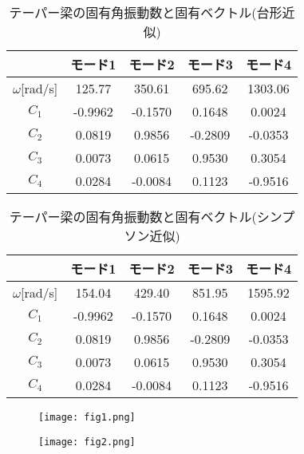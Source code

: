 \documentclass[12pt]{jsarticle}
\begin{document}
\begin{table}[htb]
  \begin{center}
    \caption{テーパー梁の固有角振動数と固有ベクトル(台形近似)}
    \begin{tabular}{|c|cccc|} \hline
       & モード1 & モード2 & モード3 & モード4  \\ \hline
      $\omega$[rad/s] & 125.77 & 350.61 & 695.62 & 1303.06 \\ \hline
      $C_1$ & -0.9962 & -0.1570 & 0.1648 & 0.0024 \\ \hline      
      $C_2$ & 0.0819 & 0.9856 & -0.2809 & -0.0353 \\ \hline
      $C_3$ & 0.0073 & 0.0615 & 0.9530 & 0.3054 \\ \hline
      $C_4$ & 0.0284 & -0.0084 & 0.1123 & -0.9516 \\ \hline
    \end{tabular}
  \end{center}
\end{table}
\begin{table}[htb]
  \begin{center}
    \caption{テーパー梁の固有角振動数と固有ベクトル(シンプソン近似)}
    \begin{tabular}{|c|cccc|} \hline
       & モード1 & モード2 & モード3 & モード4  \\ \hline
      $\omega$[rad/s] & 154.04 & 429.40 & 851.95 & 1595.92 \\ \hline
      $C_1$ & -0.9962 & -0.1570 & 0.1648 & 0.0024 \\ \hline      
      $C_2$ & 0.0819 & 0.9856 & -0.2809 & -0.0353 \\ \hline
      $C_3$ & 0.0073 & 0.0615 & 0.9530 & 0.3054 \\ \hline
      $C_4$ & 0.0284 & -0.0084 & 0.1123 & -0.9516 \\ \hline
    \end{tabular}
  \end{center}
\end{table} 
\newpage
\begin{figure}[htbp]
 \begin{minipage}{0.5\hsize}
  \begin{center}
   \texttt{[image: fig1.png]}
   \caption{}
  \end{center}
  \label{fig:one}
 \end{minipage}
 \begin{minipage}{0.5\hsize}
  \begin{center}
   \texttt{[image: fig2.png]}
   \caption{}   
  \end{center}
  \label{fig:two}
 \end{minipage}
\end{figure}
\end{document}
